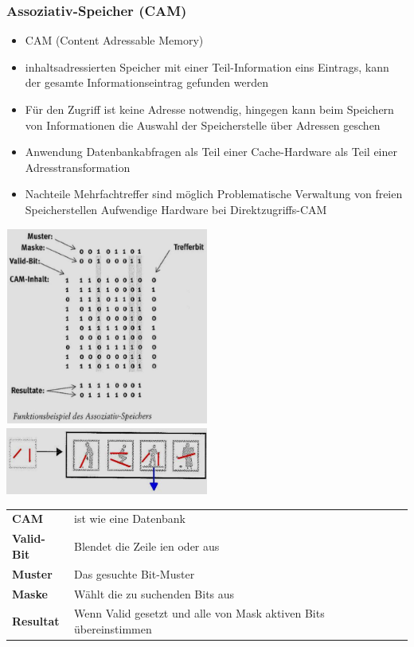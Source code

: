 \subsubsection{Assoziativ-Speicher (CAM)}
\begin{itemize}
    \item CAM (Content Adressable Memory)
    \item inhaltsadressierten Speicher
    \subitem mit einer Teil-Information eins Eintrags, kann der gesamte Informationseintrag gefunden werden
    \item Für den Zugriff ist keine Adresse notwendig, hingegen kann beim Speichern von Informationen die Auswahl der Speicherstelle über Adressen geschen
    \item Anwendung
    \subitem Datenbankabfragen
    \subitem als Teil einer Cache-Hardware
    \subitem als Teil einer Adresstransformation
    \item Nachteile
    \subitem Mehrfachtreffer sind möglich
    \subitem Problematische Verwaltung von freien Speicherstellen
    \subitem Aufwendige Hardware bei Direktzugriffs-CAM
\end{itemize}
\begin{minipage}{0.5\linewidth}
    \includegraphics[width=0.5\textwidth]{images/SystembusSpeicherSpeichersystem/SpeicherSysCAM}
    \includegraphics[width=0.5\textwidth]{images/SystembusSpeicherSpeichersystem/SpeicherSysCAM1}
\end{minipage}\newline
\begin{tabular}{ll}
   \textbf{CAM}         & ist wie eine Datenbank\\
   \textbf{Valid-Bit}   & Blendet die Zeile ien oder aus\\
   \textbf{Muster}      & Das gesuchte Bit-Muster\\
   \textbf{Maske}       & Wählt die zu suchenden Bits aus\\
   \textbf{Resultat}    & Wenn Valid gesetzt und alle von Mask aktiven Bits übereinstimmen\\
\end{tabular}
